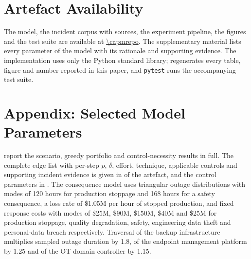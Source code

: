 \section*{Artefact Availability}

The model, the incident corpus with sources, the experiment pipeline, the
figures and the test suite are available at \url{\capmrepo}. The supplementary
material lists every parameter of the model with its rationale and supporting
evidence. The implementation uses
only the Python standard library; 
regenerates every table, figure and number reported in this paper, and
\texttt{pytest} runs the accompanying test suite.

\appendix
\section*{Appendix: Selected Model Parameters}

 report the scenario, greedy
portfolio and control-necessity results in full. The complete edge
list with per-step $p$, $\delta$, effort, technique, applicable controls and
supporting incident evidence is given in  of the
artefact, and the control parameters in . The
consequence model uses triangular outage distributions with modes of 120 hours
for production stoppage and 168 hours for a safety consequence, a loss rate of
\$1.05M per hour of stopped production, and fixed response costs with modes of
\$25M, \$90M, \$150M, \$40M and \$25M for production stoppage, quality
degradation, safety, engineering data theft and personal-data breach
respectively. Traversal of the backup infrastructure multiplies sampled outage
duration by 1.8, of the endpoint management platform by 1.25 and of the OT
domain controller by 1.15.




